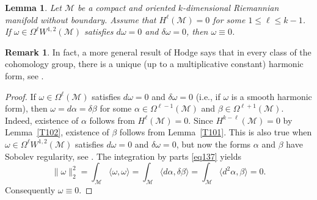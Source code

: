 \documentclass[intlimits,12pt,reqno]{amsart}
\newcommand{\cM}{\mathcal M}
\numberwithin{equation}{section}
\newtheorem{lemma}[theorem]{Lemma}
\theoremstyle{definition}
\newtheorem{remark}[theorem]{Remark}
\begin{document}
\begin{lemma}
\label{la:noharm}
Let $\cM$ be a compact and oriented $k$-dimensional Riemannian manifold without boundary. 
Assume that $H^\ell(\mathcal{M})=0$ for some $1 \leq \ell \leq k-1$.
If $\omega \in\Omega^\ell W^{1,2}(\cM)$ satisfies $d\omega=0$ and $\delta\omega=0$, then $\omega \equiv 0$.
\end{lemma}
\begin{remark}
In fact, a more general result of Hodge says that in every class of the cohomology group, there is a unique (up to a multiplicative constant) harmonic form, see \cite[Theorem~6.11]{warner}.  
\end{remark}
\begin{proof}
If  $\omega \in\Omega^\ell(\cM)$  satisfies $d\omega = 0$ and $\delta \omega = 0$ (i.e., if $\omega$ is a smooth harmonic form), then $\omega = d\alpha = \delta \beta$ for some $\alpha\in \Omega^{\ell-1}(\cM)$ and $\beta\in\Omega^{\ell+1}(\cM)$. Indeed, existence of $\alpha$ follows from $H^{\ell}(\cM)=0$. Since $H^{k-\ell}(\cM)=0$ by Lemma~\ref{T102}, existence of $\beta$ follows from Lemma~\ref{T101}.
This is also true when $\omega \in \Omega^\ell W^{1,2}(\cM)$ satisfies $d\omega=0$ and $\delta\omega=0$, but now the forms $\alpha$ and $\beta$ have Sobolev regularity, see \cite[Proposition 4.5.]{HST14}.
The integration by parts \eqref{eq137} yields 
\[
\|\omega\|_{2}^2 = \int_{\mathcal{M}} \langle\omega,\omega\rangle = \int_{\mathcal{M}} \langle d\alpha,\delta \beta\rangle = \int_{\mathcal{M}} \langle d^2\alpha,\beta\rangle=0.
\]
Consequently $\omega \equiv 0$.
\end{proof}
\end{document}
